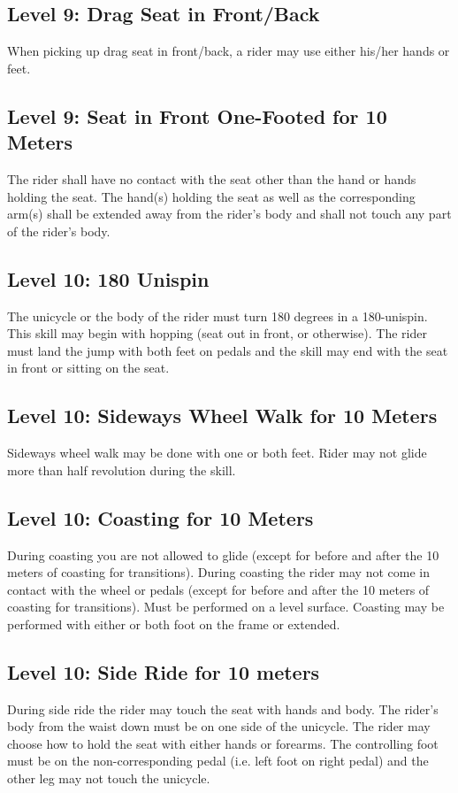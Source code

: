 \subsection{Level 9: Drag Seat in Front/Back}
When picking up drag seat in front/back, a rider may use either his/her hands or feet.

\subsection{Level 9: Seat in Front One-Footed for 10 Meters}
The rider shall have no contact with the seat other than the hand or hands holding the seat.
The hand(s) holding the seat as well as the corresponding arm(s) shall be extended away from the rider's body and shall not touch any part of the rider's body.

\subsection{Level 10: 180 Unispin}
The unicycle or the body of the rider must turn 180 degrees in a 180-unispin.
This skill may begin with hopping (seat out in front, or otherwise).
The rider must land the jump with both feet on pedals and the skill may end with the seat in
front or sitting on the seat.

\subsection{Level 10: Sideways Wheel Walk for 10 Meters}
Sideways wheel walk may be done with one or both feet.
Rider may not glide more than half revolution during the skill.

\subsection{Level 10: Coasting for 10 Meters}
During coasting you are not allowed to glide (except for before and after the 10 meters of coasting for transitions).
During coasting the rider may not come in contact with the wheel or pedals (except for before and after the 10 meters of coasting for transitions).
Must be performed on a level surface.
Coasting may be performed with either or both foot on the frame or extended.

\subsection{Level 10: Side Ride for 10 meters}
During side ride the rider may touch the seat with hands and body.
The rider's body from the waist down must be on one side of the unicycle.
The rider may choose how to hold the seat with either hands or forearms.
The controlling foot must be on the non-corresponding pedal (i.e. left foot on right pedal) and the other leg may not touch the unicycle.

